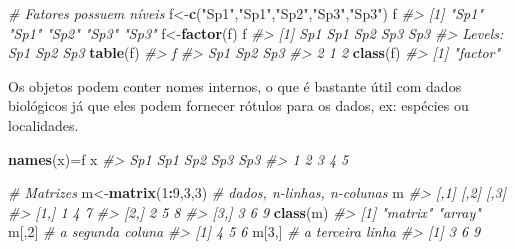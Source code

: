 \documentclass[
]{book}
\newenvironment{Shaded}{\begin{snugshade}}{\end{snugshade}}
\newcommand{\CommentTok}[1]{\textcolor[rgb]{0.56,0.35,0.01}{\textit{#1}}}
\newcommand{\DecValTok}[1]{\textcolor[rgb]{0.00,0.00,0.81}{#1}}
\newcommand{\FunctionTok}[1]{\textcolor[rgb]{0.13,0.29,0.53}{\textbf{#1}}}
\newcommand{\NormalTok}[1]{#1}
\newcommand{\OtherTok}[1]{\textcolor[rgb]{0.56,0.35,0.01}{#1}}
\newcommand{\SpecialCharTok}[1]{\textcolor[rgb]{0.81,0.36,0.00}{\textbf{#1}}}
\newcommand{\StringTok}[1]{\textcolor[rgb]{0.31,0.60,0.02}{#1}}
\begin{document}
\begin{Shaded}
\begin{Highlighting}[]
\CommentTok{\# Fatores possuem níveis}
\NormalTok{f}\OtherTok{\textless{}{-}}\FunctionTok{c}\NormalTok{(}\StringTok{"Sp1"}\NormalTok{,}\StringTok{"Sp1"}\NormalTok{,}\StringTok{"Sp2"}\NormalTok{,}\StringTok{"Sp3"}\NormalTok{,}\StringTok{"Sp3"}\NormalTok{)}
\NormalTok{f}
\CommentTok{\#\textgreater{} [1] "Sp1" "Sp1" "Sp2" "Sp3" "Sp3"}
\NormalTok{f}\OtherTok{\textless{}{-}}\FunctionTok{factor}\NormalTok{(f)}
\NormalTok{f}
\CommentTok{\#\textgreater{} [1] Sp1 Sp1 Sp2 Sp3 Sp3}
\CommentTok{\#\textgreater{} Levels: Sp1 Sp2 Sp3}
\FunctionTok{table}\NormalTok{(f)}
\CommentTok{\#\textgreater{} f}
\CommentTok{\#\textgreater{} Sp1 Sp2 Sp3 }
\CommentTok{\#\textgreater{}   2   1   2}
\FunctionTok{class}\NormalTok{(f)}
\CommentTok{\#\textgreater{} [1] "factor"}
\end{Highlighting}
\end{Shaded}

Os objetos podem conter nomes internos, o que é bastante útil com dados biológicos já que eles podem fornecer rótulos para os dados, ex: espécies ou localidades.

\begin{Shaded}
\begin{Highlighting}[]
\FunctionTok{names}\NormalTok{(x)}\OtherTok{=}\NormalTok{f}
\NormalTok{x}
\CommentTok{\#\textgreater{} Sp1 Sp1 Sp2 Sp3 Sp3 }
\CommentTok{\#\textgreater{}   1   2   3   4   5}
\end{Highlighting}
\end{Shaded}

\begin{Shaded}
\begin{Highlighting}[]
\CommentTok{\# Matrizes}
\NormalTok{m}\OtherTok{\textless{}{-}}\FunctionTok{matrix}\NormalTok{(}\DecValTok{1}\SpecialCharTok{:}\DecValTok{9}\NormalTok{,}\DecValTok{3}\NormalTok{,}\DecValTok{3}\NormalTok{) }\CommentTok{\# dados, n{-}linhas, n{-}colunas}
\NormalTok{m}
\CommentTok{\#\textgreater{}      [,1] [,2] [,3]}
\CommentTok{\#\textgreater{} [1,]    1    4    7}
\CommentTok{\#\textgreater{} [2,]    2    5    8}
\CommentTok{\#\textgreater{} [3,]    3    6    9}
\FunctionTok{class}\NormalTok{(m)}
\CommentTok{\#\textgreater{} [1] "matrix" "array"}
\NormalTok{m[,}\DecValTok{2}\NormalTok{] }\CommentTok{\# a segunda coluna}
\CommentTok{\#\textgreater{} [1] 4 5 6}
\NormalTok{m[}\DecValTok{3}\NormalTok{,] }\CommentTok{\# a terceira linha}
\CommentTok{\#\textgreater{} [1] 3 6 9}
\end{Highlighting}
\end{Shaded}
\end{document}
